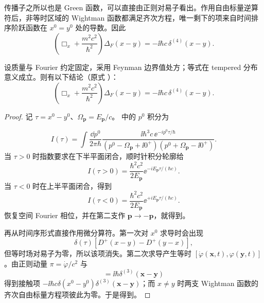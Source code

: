 传播子之所以也是 Green 函数，可以直接由正则对易子看出。作用自由标量逆算符后，非等时区域的 Wightman 函数都满足齐次方程，唯一剩下的项来自时间排序阶跃函数在 $x^0=y^0$ 处的导数。因此
\begin{equation}
\boxed{
\left(\Box_x+\frac{m^2c^2}{\hbar^2}\right)\Delta_F(x-y)
=-\ii\hbar c\,\delta^{(4)}(x-y).}
\label{eq:scalar-green-exact-r2}
\end{equation}

\begin{proposition}
设质量与 Fourier 约定固定，采用 Feynman 边界值处方；等式在 tempered 分布意义成立。则有以下结论（原式 ）：
\begin{equation*}
\boxed{
\left(\Box_x+\frac{m^2c^2}{\hbar^2}\right)\Delta_F(x-y)
=-\ii\hbar c\,\delta^{(4)}(x-y).}
\end{equation*}
\end{proposition}
\begin{proof}
记 $\tau=x^0-y^0$、$\Omega_{\mathbf p}=E_{\mathbf p}/c$。 中的 $p^0$ 积分为

\begin{equation*}
I(\tau)=\int\frac{\dd p^0}{2\pi\hbar}
\frac{\ii\hbar^3c\,\ee^{-ip^0\tau/\hbar}}
{(p^0-\Omega_{\mathbf p}+\ii0^+)(p^0+\Omega_{\mathbf p}-\ii0^+)}.
\end{equation*}
当 $\tau>0$ 时指数要求在下半平面闭合，顺时针积分轮廓给
\begin{equation*}
I(\tau>0)=\frac{\hbar^2c^2}{2E_{\mathbf p}}
 \ee^{-iE_{\mathbf p}\tau/(\hbar c)}.
\end{equation*}
当 $\tau<0$ 时在上半平面闭合，得到
\begin{equation*}
I(\tau<0)=\frac{\hbar^2c^2}{2E_{\mathbf p}}
 \ee^{+iE_{\mathbf p}\tau/(\hbar c)}.
\end{equation*}
恢复空间 Fourier 相位，并在第二支作 $\mathbf p\to-\mathbf p$，就得到。

再从时间序形式直接作用微分算符。第一次对 $x^0$ 求导时会出现
\begin{equation*}
\delta(\tau)[D^+(x-y)-D^+(y-x)],
\end{equation*}
但等时场对易子为零，所以该项消失。第二次求导产生等时 $[\dot\varphi(\mathbf x,t),\varphi(\mathbf y,t)]$。由正则动量 $\pi=\dot\varphi/c^2$ 与
\begin{equation*}
[\varphi(\mathbf x,t),\pi(\mathbf y,t)]=\ii\hbar\delta^{(3)}(\mathbf x-\mathbf y)
\end{equation*}
得到接触项 $-\ii\hbar c\delta(x^0-y^0)\delta^{(3)}(\mathbf x-\mathbf y)$；而 $x\ne y$ 时两支 Wightman 函数的齐次自由标量方程项彼此为零。于是得到。
\end{proof}

